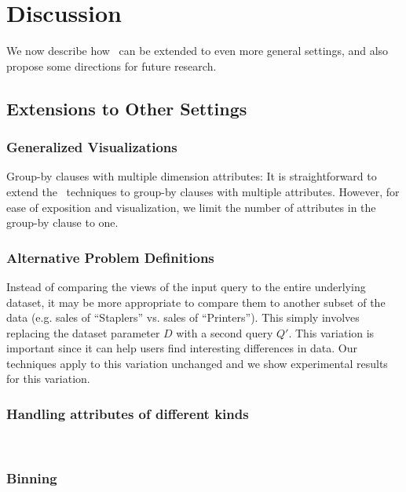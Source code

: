 

\section{Discussion}
\label{sec:discussion}
We now describe how \SeeDB\ can be extended to even more general settings,
and also propose some directions for future research.

\subsection{Extensions to Other Settings}\label{sec:discussion:ext}

\subsubsection{Generalized Visualizations}\label{sec:discussion:multi-col}

Group-by clauses with multiple dimension attributes: It is
straightforward to extend the \SeeDB\ techniques  to group-by clauses with multiple attributes.
However, for ease of exposition and visualization, we limit the number of
attributes in the group-by clause to one.

\subsubsection{Alternative Problem Definitions}\label{sec:discussion:def}
Instead of comparing the views of
the input query to the entire underlying dataset, it may be more appropriate to
compare them to another subset of the data (e.g. sales of ``Staplers'' vs.
sales of ``Printers''). This simply involves replacing the dataset parameter $D$
with a second query $Q'$. This variation is important since it can help users
find interesting differences in data. Our techniques apply to this variation
unchanged and we show experimental results for this variation.

\subsubsection{Handling attributes of different kinds}
\\

\subsubsection{Binning}



